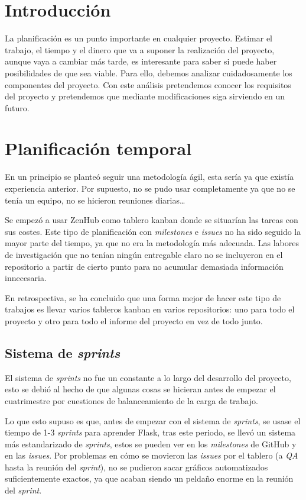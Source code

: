 
\section{Introducción}

La planificación es un punto importante en cualquier proyecto. Estimar el trabajo, el tiempo y el dinero que va a suponer la realización del proyecto, aunque vaya a cambiar más tarde, es interesante para saber si puede haber posibilidades de que sea viable. Para ello, debemos analizar cuidadosamente los componentes del proyecto. Con este análisis pretendemos conocer los requisitos del proyecto y pretendemos que mediante modificaciones siga sirviendo en un futuro.

\section{Planificación temporal}
En un principio se planteó seguir una metodología ágil, esta sería  \cite{scrum} ya que existía experiencia anterior. Por supuesto, no se pudo usar completamente ya que no se tenía un equipo, no se hicieron reuniones diarias\ldots

Se empezó a usar ZenHub como tablero kanban donde se situarían las tareas con sus costes. Este tipo de planificación con \emph{milestones} e \emph{issues} no ha sido seguido la mayor parte del tiempo, ya que no era la metodología más adecuada. Las labores de investigación que no tenían ningún entregable claro no se incluyeron en el repositorio a partir de cierto punto para no acumular demasiada información innecesaria.

En retrospectiva, se ha concluido que una forma mejor de hacer este tipo de trabajos es llevar varios tableros kanban en varios repositorios: uno para todo el proyecto y otro para todo el informe del proyecto en vez de todo junto.

\subsection{Sistema de \emph{sprints}}

El sistema de \emph{sprints} no fue un constante a lo largo del desarrollo del proyecto, esto se debió al hecho de que algunas cosas se hicieran antes de empezar el cuatrimestre por cuestiones de balanceamiento de la carga de trabajo.

Lo que esto supuso es que, antes de empezar con el sistema de \emph{sprints}, se usase el tiempo de 1-3 \emph{sprints} para aprender Flask, tras este periodo, se llevó un sistema más estandarizado de \emph{sprints}, estos se pueden ver en los \emph{milestones} de GitHub y en las \emph{issues}. Por problemas en cómo se movieron las \emph{issues} por el tablero (a \emph{QA} hasta la reunión del \emph{sprint}), no se pudieron sacar gráficos automatizados suficientemente exactos, ya que acaban siendo un peldaño enorme en la reunión del \emph{sprint}.

